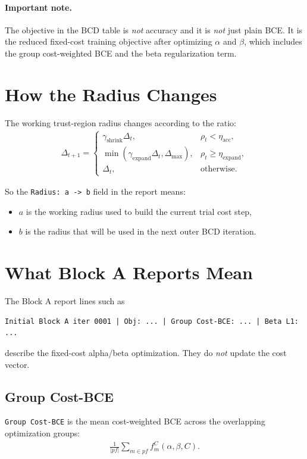 \documentclass[11pt]{article}
\begin{document}
\paragraph{Important note.}
The objective in the BCD table is \emph{not} accuracy and it is \emph{not} just
plain BCE. It is the reduced fixed-cost training objective after optimizing
$\alpha$ and $\beta$, which includes the group cost-weighted BCE and the beta
regularization term.

\section{How the Radius Changes}
The working trust-region radius changes according to the ratio:
\begin{align}
\Delta_{t+1}
=
\begin{cases}
\gamma_{\mathrm{shrink}} \Delta_t, & \rho_t < \eta_{\mathrm{acc}}, \\
\min(\gamma_{\mathrm{expand}}\Delta_t,\Delta_{\max}), & \rho_t \ge \eta_{\mathrm{expand}}, \\
\Delta_t, & \text{otherwise.}
\end{cases}
\end{align}

So the \texttt{Radius: a -> b} field in the report means:
\begin{itemize}
\item $a$ is the working radius used to build the current trial cost step,
\item $b$ is the radius that will be used in the next outer BCD iteration.
\end{itemize}

\section{What Block A Reports Mean}
The Block A report lines such as
\begin{verbatim}
Initial Block A iter 0001 | Obj: ... | Group Cost-BCE: ... | Beta L1: ...
\end{verbatim}
describe the fixed-cost alpha/beta optimization. They do \emph{not} update the
cost vector.

\subsection{Group Cost-BCE}
\texttt{Group Cost-BCE} is the mean cost-weighted BCE across the overlapping
optimization groups:
\begin{align}
\frac{1}{|pf|}
\sum_{m \in pf}
f_m^C(\alpha,\beta,C).
\end{align}
\end{document}
